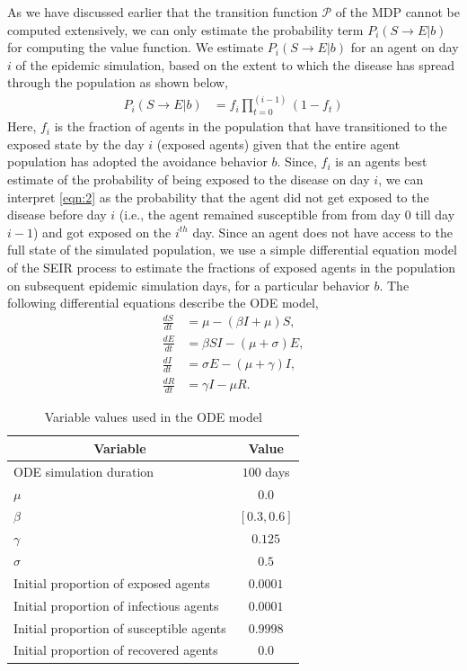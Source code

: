 \documentclass[doublespace,draft]{VTthesis}
\begin{document}
    As we have discussed earlier that the transition function $\mathcal{P}$ of the MDP cannot be computed extensively, we can only estimate the probability term $P_i(S \rightarrow E|b)$ for computing the value function. We estimate $P_i(S \rightarrow E|b)$ for an agent on day $i$ of the epidemic simulation, based on the extent to which the disease has spread through the population as shown below,
    \begin{align}
    P_i(S \rightarrow E|b) &= f_i  \prod_{t=0}^{(i-1)} (1 - f_t)
    \label{eqn:2}
    \end{align}
    Here, $f_i$ is the fraction of agents in the population that have transitioned to the exposed state by the day $i$ (exposed agents) given that the entire agent population has adopted the avoidance behavior $b$. Since, $f_i$ is an agents best estimate of the probability of being exposed to the disease on day $i$, we can interpret \ref{eqn:2} as the probability that the agent did not get exposed to the disease before day $i$ (i.e., the agent remained susceptible from from day $0$ till day $i-1$) and got exposed on the $i^{th}$ day. Since an agent does not have access to the full state of the simulated population, we use a simple differential equation model of the SEIR process \cite{hethcote1976qualitative} to estimate the fractions of exposed agents in the population on subsequent epidemic simulation days, for a particular behavior $b$. The following differential equations describe the ODE model,
    \begin{align*} 
    		\frac{dS}{dt} &= \mu - (\beta I + \mu) S, \\
    		\frac{dE}{dt} &= \beta S I - (\mu + \sigma) E, \\
    		\frac{dI}{dt} &= \sigma E - (\mu + \gamma) I, \\
    		\frac{dR}{dt} &= \gamma I - \mu R.
    \end{align*}
    \begin{table}[!t]
    \renewcommand{\arraystretch}{1.2}
    \caption{Variable values used in the ODE model}
    \centering
    \begin{tabular}{|l|c|}
    \hline
    \multicolumn{1}{|c|}{\textbf{Variable}} & \textbf{Value}  \\ \hline
    ODE simulation duration & $100$ days\\ \hline
    $\mu$ & $0.0$ \\ \hline
    $\beta$ & $[0.3,0.6]$ \\ \hline
    $\gamma$ & $0.125$ \\ \hline
    $\sigma$ & $0.5$ \\ \hline
    Initial proportion of exposed agents & $0.0001$ \\ \hline 
    Initial proportion of infectious agents & $0.0001$ \\ \hline
    Initial proportion of susceptible agents & $0.9998$ \\ \hline
    Initial proportion of recovered agents & $0.0$ \\ \hline
    \end{tabular}
    \label{table:ode}
    \end{table}
\end{document}
